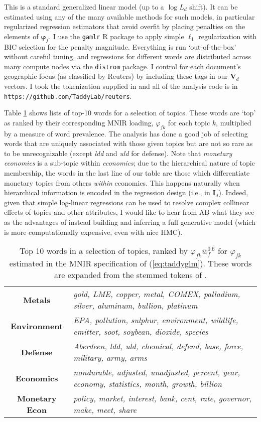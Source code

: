 \documentclass[12pt]{article}
\newcommand{\bs}[1]{\boldsymbol{#1}}
\newcommand{\bm}[1]{\mathbf{#1}}
\begin{document}
This is a standard generalized linear model (up to a $\log L_d$ shift).  It can be estimated using any of the many available methods for such models, in particular regularized regression estimators that avoid overfit by placing penalties on the elements of $\bs{\varphi}_f$.  I use the {\tt gamlr} R package  \citep[implementing the POSE algorithms of][]{taddy_one-step_2015} to apply simple $\ell_1$ regularization  with BIC selection for the penalty magnitude.  Everything is run `out-of-the-box' without careful tuning, and regressions for different words are distributed across many compute nodes via the {\tt distrom} package.  I control for each document's geographic focus (as classified by Reuters) by including these tags in our $\bm{V}_d$ vectors.  I took the  tokenization supplied in \cite{lewis2004rcv1} and all of the analysis code is in {\tt https://github.com/TaddyLab/reuters}.

Table \ref{wordtab} shows lists of top-10 words for a selection of topics.
These words are `top' as ranked by their corresponding MNIR loading,
$\varphi_{fk}$ for each topic $k$,  multiplied by a measure of word
prevalence.  The analysis has done a good job of selecting words that are
uniquely associated with those given topics but are not so rare as to be
unrecognizable (except  {\it ldd} and {\it uld} for defense).  Note that {\it
monetary economics} is a sub-topic within {\it economics}; due to the
hierarchical nature of topic membership, the words in the last line of our
table are those which differentiate monetary topics from others {\it within}
economics.  This happens naturally when hierarchical information is encoded in
the regression design (i.e., in $\mathbf{I}_d$). Indeed, given that 
simple log-linear regressions can be used to resolve complex collinear effects of
topics and other attributes, I would like to hear from AB what they see as the advantages of instead building and inferring a full generative model (which is  more
computationally expensive, even with nice HMC).

\begin{table}[t]\footnotesize
  \begin{tabular}{c|l}
  \bf  Metals & \it gold, LME, copper, metal, COMEX, palladium, silver, aluminum, bullion, platinum \\
 \bf  Environment & \it EPA, pollution, sulphur, environment, wildlife, emitter, soot, soybean, dioxide, species \\
 \bf  Defense & \it Aberdeen, ldd, uld, chemical, defend, base, force, military, army, arms \\
 \bf  Economics & \it nondurable, adjusted, unadjusted, percent, year, economy, statistics, month, growth, billion \\
 \bf  Monetary Econ & \it policy, market, interest, bank, cent, rate, governor, make, meet, share 
 \end{tabular}
 \caption{\label{wordtab} Top 10 words in a selection of topics, ranked by $\varphi_{fk} {\bar w}_f^{0.6}$ for $\varphi_{fk}$ estimated in the MNIR specification of (\ref{eq:taddyglm}). These words are expanded from the stemmed tokens of \cite{lewis2004rcv1}.  }
\end{table}  
\end{document}
